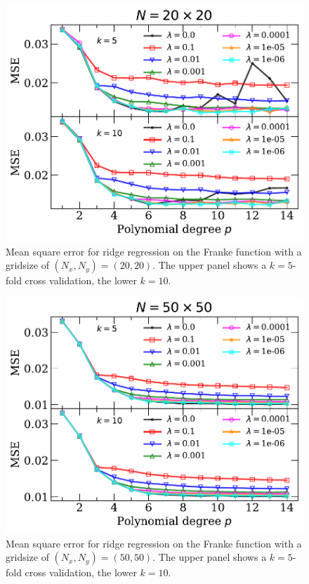 \documentclass[a4paper, 
amsfonts, 
amssymb, 
amsmath, 
reprint, 
showkeys, 
nofootinbib, 
twoside]{revtex4-2}
\begin{document}
\begin{figure}
    \centering
    \includegraphics[width = \columnwidth]{Figures/mseRidge_n20.pdf}
    \caption{Mean square error for ridge regression on the Franke function with a gridsize of $(N_x,N_y) = (20, 20)$. The upper panel shows a $k = 5$-fold cross validation, the lower $k = 10$.}
    \label{fig:mse_ridge_20}
\end{figure}

\begin{figure}
    \centering
    \includegraphics[width = \columnwidth]{Figures/mseRidge_n50.pdf}
    \caption{Mean square error for ridge regression on the Franke function with a gridsize of $(N_x,N_y) = (50, 50)$. The upper panel shows a $k = 5$-fold cross validation, the lower $k = 10$.}
    \label{fig:mse_rdige_50}
\end{figure}
\end{document}
